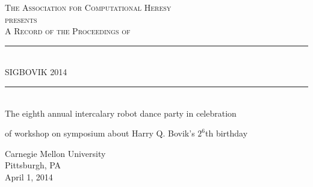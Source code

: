 \documentclass{article}
\begin{document}
\setmainfont{Rumsey}
\setsansfont{Birbaslo}

\newcommand{\HRule}{\rule{\linewidth}{0.5mm}}

\begin{titlepage}
\begin{center}

\textsc{\LARGE The Association for Computational Heresy}\\[0.5cm]

\textsc{\large presents}\\[1cm]

\textsc{\Large A Record of the Proceedings of}\\[0.5cm]
\HRule \\[0.4cm]
{ \Huge \sf SIGBOVIK 2014 \\[0.4cm] }

\HRule \\[2cm]


The eighth annual intercalary robot dance party in celebration

of workshop on symposium about Harry Q. Bovik's $2^6$th birthday

\vfill

{\Large Carnegie Mellon University\\[0.25cm]
Pittsburgh, PA\\[0.3cm]
April 1, 2014}

\end{center}
\end{titlepage}
\end{document}
